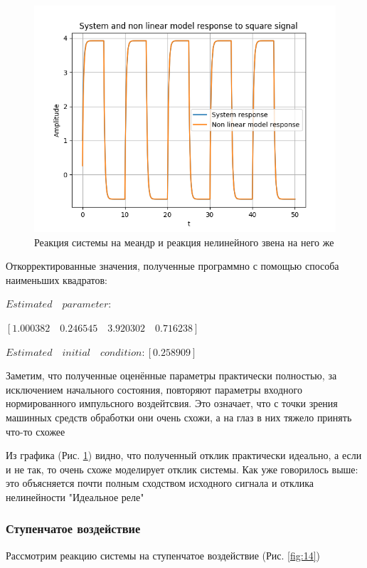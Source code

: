 \begin{figure}[H]
	\centering
	\includegraphics[width=1\linewidth]{body/images/System-and-non-linear-model-response-to-square-signal.png}
	\caption{Реакция системы на меандр и реакция нелинейного звена на него же}
	\label{fig:13}
\end{figure}

Откорректированные значения, полученные программно с помощью способа наименьших квадратов:

$Estimated\quad parameter:$

\qquad$[1.000382\quad 0.246545\quad 3.920302\quad 0.716238]$

$Estimated\quad initial\quad condition: [0.258909]$

Заметим, что полученные оценённые параметры практически полностью, за исключением начального состояния, повторяют параметры входного нормированного импульсного воздейтсвия. Это означает,
что с точки зрения машинных средств обработки они очень схожи, а на глаз в них тяжело принять что-то схожее

Из графика (Рис. \ref{fig:13}) видно, что полученный отклик практически идеально, а если и не так, то очень схоже моделирует отклик системы. Как уже говорилось выше: это объясняется почти полным
сходством исходного сигнала и отклика нелинейности "Идеальное реле"

\subsubsection{Ступенчатое воздействие}
Рассмотрим реакцию системы на ступенчатое воздействие (Рис. \ref{fig:14})

